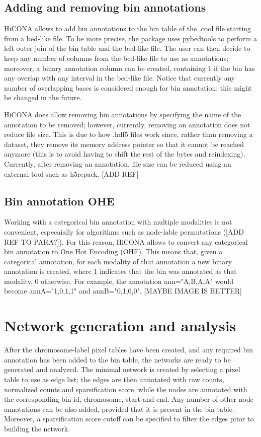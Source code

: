 \subsection{Adding and removing bin annotations}

HiCONA allows to add bin annotations to the bin table of the .cool file starting from a bed-like file. To be more precise, the package uses pybedtools to perform a left outer join of the bin table and the bed-like file. The user can then decide to keep any number of columns from the bed-like file to use as annotations; moreover, a binary annotation column can be created, containing 1 if the bin has any overlap with any interval in the bed-like file. Notice that currently any number of overlapping bases is considered enough for bin annotation; this might be changed in the future.

HiCONA does allow removing bin annotations by specifying the name of the annotation to be removed; however, currently, removing an annotation does not reduce file size. This is due to how .hdf5 files work since, rather than removing a dataset, they remove its memory address pointer so that it cannot be reached anymore (this is to avoid having to shift the rest of the bytes and reindexing). Currently, after removing an annotation, file size can be reduced using an external tool such as h5repack. [ADD REF]

\subsection{Bin annotation OHE}

Working with a categorical bin annotation with multiple modalities is not convenient, especaially for algorithms such as node-lable permutations ([ADD REF TO PARA?]). For this reason, HiCONA allows to convert any categorical bin annotation to One Hot Encoding (OHE). This means that, given a categorical annotation, for each modality of that annotation a new binary annotation is created, where 1 indicates that the bin was annotated as that modality, 0 otherwise. For example, the annotation ann="A,B,A,A" would become annA="1,0,1,1" and annB="0,1,0,0". [MAYBE IMAGE IS BETTER]

\section{Network generation and analysis}

After the chromosome-label pixel tables have been created, and any required bin annotation has been added to the bin table, the networks are ready to be generated and analyzed. The minimal network is created by selecting a pixel table to use as edge list; the edges are then annotated with raw counts, normalized counts and sparsification score, while the nodes are annotated with the corresponding bin id, chromosome, start and end. Any number of other node annotations can be also added, provided that it is present in the bin table. Moreover, a sparsification score cutoff can be specified to filter the edges prior to building the network.

